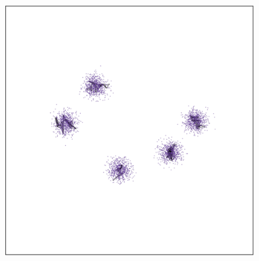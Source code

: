 \documentclass[
  12pt]{article}
\begin{document}
\begin{figure}[H]
\begin{minipage}[t]{0.33\linewidth}
{{\includegraphics{figures/five_gau_clusters/sc_phate_2.png}

}

}

\subcaption{\label{fig-gau3_sc2}}
\end{minipage}%
%
\begin{minipage}[t]{0.33\linewidth}

{\centering 

}
\end{minipage}
\end{figure}
\end{document}

